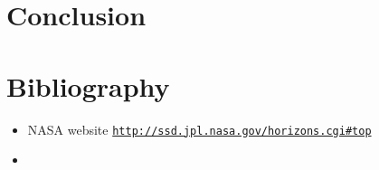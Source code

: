 \documentclass[a4paper, twoside, 11pt]{report}
\theoremstyle{theorem}
\theoremstyle{remark}
\theoremstyle{exemple}
\begin{document}
        \subsection{}
    
    

\chapter*{Conclusion}

    \paragraph{}
    
    
    
    
\chapter*{Bibliography}
    \begin{itemize}
        \item NASA website \href{{http://ssd.jpl.nasa.gov/horizons.cgi#top}}{\nolinkurl{http://ssd.jpl.nasa.gov/horizons.cgi\#top}}
        \item 
    \end{itemize}
    
    
    
    
    
    
    
    
    
    
\end{document}
